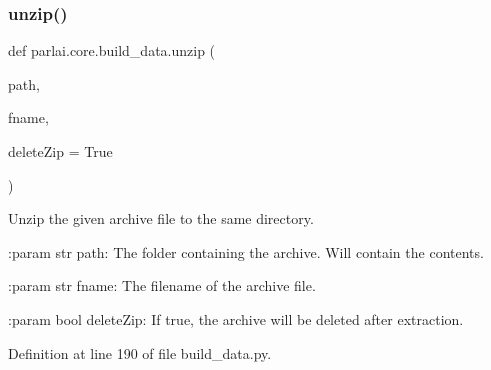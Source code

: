 \subsubsection{\texorpdfstring{unzip()}{unzip()}}
{\footnotesize\ttfamily def parlai.\+core.\+build\+\_\+data.\+unzip (\begin{DoxyParamCaption}\item[{}]{path,  }\item[{}]{fname,  }\item[{}]{delete\+Zip = {\ttfamily True} }\end{DoxyParamCaption})}

\begin{DoxyVerb}Unzip the given archive file to the same directory.

:param str path:
    The folder containing the archive. Will contain the contents.

:param str fname:
    The filename of the archive file.

:param bool deleteZip:
    If true, the archive will be deleted after extraction.
\end{DoxyVerb}
 

Definition at line 190 of file build\+\_\+data.\+py.

